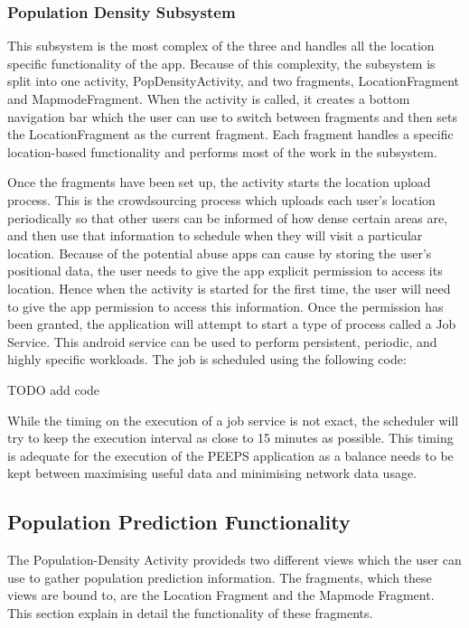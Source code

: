 \subsubsection{Population Density Subsystem}
This subsystem is the most complex of the three and handles all the location specific functionality of the app. Because of this complexity, the subsystem is split into one activity, PopDensityActivity, and two fragments, LocationFragment and MapmodeFragment. When the activity is called, it creates a bottom navigation bar which the user can use to switch between fragments and then sets the LocationFragment as the current fragment. Each fragment handles a specific location-based functionality and performs most of the work in the subsystem. 

Once the fragments have been set up, the activity starts the location upload process. This is the crowdsourcing process which uploads each user’s location periodically so that other users can be informed of how dense certain areas are, and then use that information to schedule when they will visit a particular location. Because of the potential abuse apps can cause by storing the user’s positional data, the user needs to give the app explicit permission to access its location. Hence when the activity is started for the first time, the user will need to give the app permission to access this information. Once the permission has been granted, the application will attempt to start a type of process called a Job Service. This android service can be used to perform persistent, periodic, and highly specific workloads. The job is scheduled using the following code:

TODO add code

While the timing on the execution of a job service is not exact, the scheduler will try to keep the execution interval as close to 15 minutes as possible. This timing is adequate for the execution of the PEEPS application as a balance needs to be kept between maximising useful data and minimising network data usage.

\subsection{Population Prediction Functionality} 
The Population-Density Activity provideds two different views which the user can use to gather population prediction information. The fragments, which these views are bound to, are the Location Fragment and the Mapmode Fragment. This section explain in detail the functionality of these fragments.

